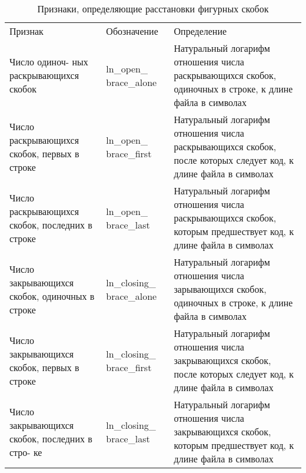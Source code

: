 \begin{table}[ht!]
\caption{ Признаки, определяющие расстановки фигурных скобок }
\label{tab:lex_3}
\begin{center}
\begin{tabularx}{\linewidth}{|>{\hsize=0.23\hsize}X|>{\hsize=0.17\hsize}X|>{\hsize=0.6\hsize}X|}
\hline
\multicolumn{3}{|c|}{Стиль расстановки фигурных скобок}\\
\hline
Признак & Обозначение & Определение \\
\hline
Число одиноч- ных раскрывающихся скобок & ln\_open\_ brace\_alone & Натуральный логарифм отношения 
числа раскрывающихся скобок, одиночных в строке, к
длине файла в символах\\
\hline
Число раскрывающихся скобок, первых в строке& ln\_open\_ brace\_first& Натуральный логарифм 
отношения числа раскрывающихся скобок, после которых следует код, к длине файла в символах\\
\hline
Число раскрывающихся скобок, последних в строке & ln\_open\_ brace\_last& Натуральный логарифм 
отношения числа раскрывающихся скобок, которым предшествует код, к длине файла в символах\\
\hline
Число закрывающихся скобок, одиночных в строке & ln\_closing\_ brace\_alone& Натуральный логарифм отношения 
числа зарывающихся скобок, одиночных в строке, к длине файла в символах\\
\hline
Число закрывающихся скобок, первых в строке & ln\_closing\_ brace\_first& Натуральный логарифм 
отношения числа закрывающихся скобок, после которых следует код, к длине файла в символах\\
\hline
Число закрывающихся скобок, последних в стро- ке & ln\_closing\_ brace\_last& Натуральный логарифм отношения 
числа закрывающихся скобок, которым предшествует код, к длине файла в символах\\
\hline
\end{tabularx}
\end{center}
\end{table}

\clearpage

